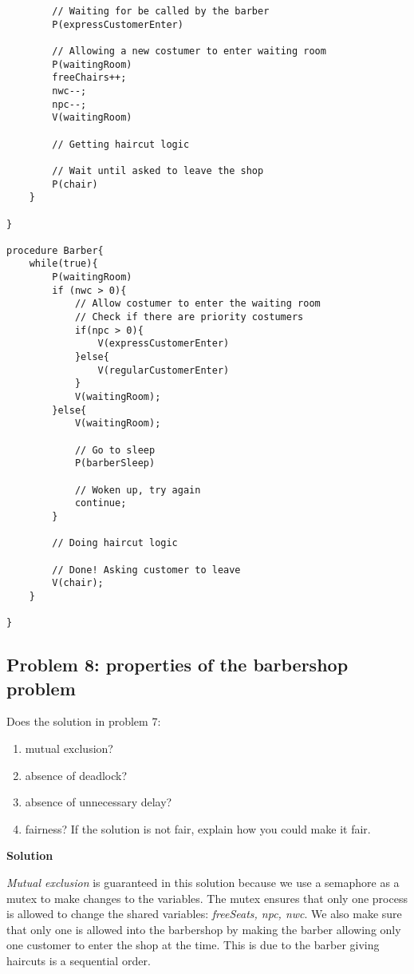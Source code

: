 \begin{lstlisting}
        // Waiting for be called by the barber
        P(expressCustomerEnter)

        // Allowing a new costumer to enter waiting room
        P(waitingRoom)
        freeChairs++;
        nwc--; 
        npc--;
        V(waitingRoom)

        // Getting haircut logic 

        // Wait until asked to leave the shop 
        P(chair)
    }

}

procedure Barber{
    while(true){
        P(waitingRoom)
        if (nwc > 0){
            // Allow costumer to enter the waiting room    
            // Check if there are priority costumers 
            if(npc > 0){
                V(expressCustomerEnter)
            }else{
                V(regularCustomerEnter)
            }
            V(waitingRoom);
        }else{
            V(waitingRoom);

            // Go to sleep
            P(barberSleep)

            // Woken up, try again
            continue;
        }

        // Doing haircut logic

        // Done! Asking customer to leave
        V(chair);
    }

}

\end{lstlisting}


\subsection{Problem 8: properties of the barbershop problem}

Does the solution in problem 7: 

\begin{enumerate}
    \item mutual exclusion?
    \item absence of deadlock?
    \item absence of unnecessary delay? 
    \item fairness? If the solution is not fair, explain how you could make it fair.
\end{enumerate}

\textbf{Solution}

\textit{Mutual exclusion} is guaranteed in this solution because we use a semaphore as a mutex to make changes to the variables. 
The mutex ensures that only one process is allowed to change the shared variables: \textit{freeSeats, npc, nwc}. 
We also make sure that only one is allowed into the barbershop by making the barber allowing only one customer to enter the shop at the time. 
This is due to the barber giving haircuts is a sequential order. \\

